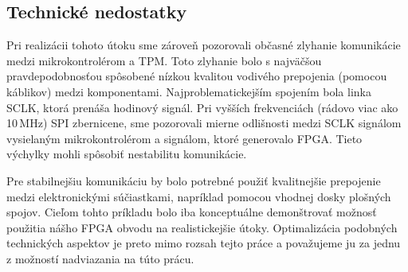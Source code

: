 \subsection{Technické nedostatky}
Pri realizácii tohoto útoku sme zároveň pozorovali občasné zlyhanie komunikácie medzi mikrokontrolérom a TPM. Toto zlyhanie bolo s najväčšou pravdepodobnosťou spôsobené nízkou kvalitou vodivého prepojenia (pomocou káblikov) medzi komponentami. Najproblematickejším spojením bola linka SCLK, ktorá prenáša hodinový signál. Pri vyšších frekvenciách (rádovo viac ako 10\,MHz) SPI zbernicene, sme pozorovali mierne odlišnosti medzi SCLK signálom vysielaným mikrokontrolérom a signálom, ktoré generovalo FPGA. Tieto výchylky mohli spôsobiť nestabilitu komunikácie. 

Pre stabilnejšiu komunikáciu by bolo potrebné použiť kvalitnejšie prepojenie medzi elektronickými súčiastkami, napríklad pomocou vhodnej dosky plošných spojov. Cieľom tohto príkladu bolo iba konceptuálne demonštrovať možnosť použitia nášho FPGA obvodu na realistickejšie útoky. Optimalizácia podobných technických aspektov je preto mimo rozsah tejto práce a považujeme ju za jednu z možností nadviazania na túto prácu.